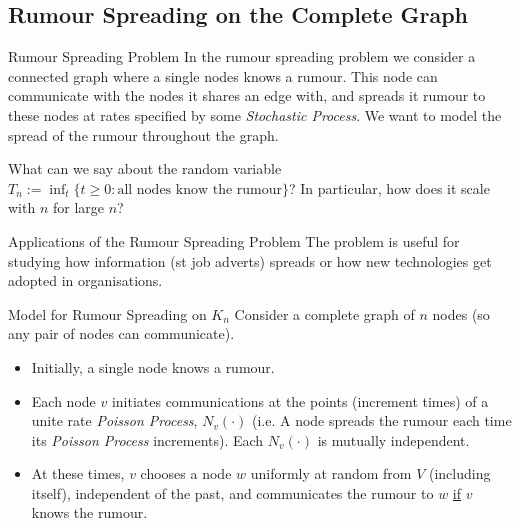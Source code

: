 \documentclass[11pt,a4paper]{article}
\begin{document}
\subsection{Rumour Spreading on the Complete Graph}

\begin{proposition}{Rumour Spreading Problem}
  In the rumour spreading problem we consider a connected graph where a single nodes knows a rumour. This node can communicate with the nodes it shares an edge with, and spreads it rumour to these nodes at rates specified by some \textit{Stochastic Process}. We want to model the spread of the rumour throughout the graph.
  \par What can we say about the random variable $T_n:=\inf_t\{t\geq0:\text{all nodes know the rumour}\}$? In particular, how does it scale with $n$ for large $n$?
\end{proposition}

\begin{remark}{Applications of the Rumour Spreading Problem}
  The problem is useful for studying how information (st job adverts) spreads or how new technologies get adopted in organisations.
\end{remark}

\begin{proposition}{Model for Rumour Spreading on $K_n$}
  Consider a complete graph of $n$ nodes (so any pair of nodes can communicate).
  \begin{itemize}
    \item Initially, a single node knows a rumour.
    \item Each node $v$ initiates communications at the points (increment times) of a unite rate \textit{Poisson Process}, $N_v(\cdot)$ (i.e. A node spreads the rumour each time its \textit{Poisson Process} increments). Each $N_v(\cdot)$ is mutually independent.
    \item At these times, $v$ chooses a node $w$ uniformly at random from $V$ (including itself), independent of the past, and communicates the rumour to $w$ \underline{if} $v$ knows the rumour.
  \end{itemize}
\end{proposition}
\end{document}
